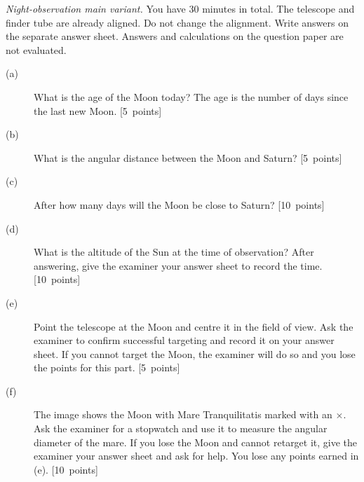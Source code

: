 \textit{Night-observation main variant.}
You have 30 minutes in total. The telescope and finder tube are already aligned.
Do not change the alignment. Write answers on the separate answer sheet.
Answers and calculations on the question paper are not evaluated.

\begin{description}
\item[(a)] What is the age of the Moon today? The age is the number of days
since the last new Moon. \hfill\mbox{[5 points]}
\item[(b)] What is the angular distance between the Moon and Saturn?
\hfill\mbox{[5 points]}
\item[(c)] After how many days will the Moon be close to Saturn?
\hfill\mbox{[10 points]}
\item[(d)] What is the altitude of the Sun at the time of observation? After
answering, give the examiner your answer sheet to record the time.
\hfill\mbox{[10 points]}
\item[(e)] Point the telescope at the Moon and centre it in the field of view.
Ask the examiner to confirm successful targeting and record it on your answer
sheet. If you cannot target the Moon, the examiner will do so and you lose
the points for this part. \hfill\mbox{[5 points]}
\item[(f)] The image shows the Moon with Mare Tranquilitatis marked with an
\(\times\). Ask the examiner for a stopwatch and use it to measure the angular
diameter of the mare. If you lose the Moon and cannot retarget it, give the
examiner your answer sheet and ask for help. You lose any points earned in (e).
\hfill\mbox{[10 points]}
\end{description}
